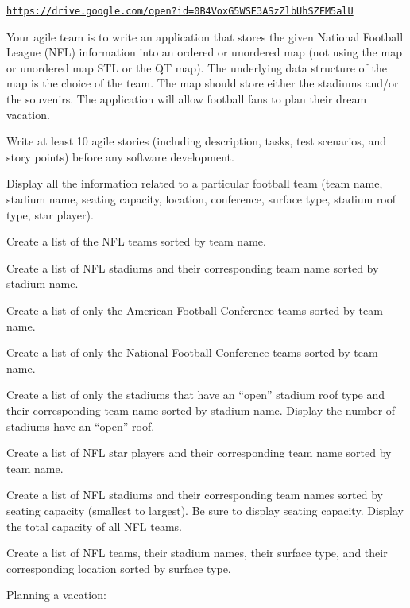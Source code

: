 \href{https://drive.google.com/open?id=0B4VoxG5WSE3ASzZlbUhSZFM5alU}{\tt https\+://drive.\+google.\+com/open?id=0\+B4\+Vox\+G5\+W\+S\+E3\+A\+Sz\+Zlb\+Uh\+S\+Z\+F\+M5alU} 

 Your agile team is to write an application that stores the given National Football League (N\+FL) information into an ordered or unordered map (not using the map or unordered map S\+TL or the QT map). The underlying data structure of the map is the choice of the team. The map should store either the stadiums and/or the souvenirs. The application will allow football fans to plan their dream vacation.


\begin{DoxyEnumerate}
\item Write at least 10 agile stories (including description, tasks, test scenarios, and story points) before any software development.
\item Display all the information related to a particular football team (team name, stadium name, seating capacity, location, conference, surface type, stadium roof type, star player).
\item Create a list of the N\+FL teams sorted by team name.
\item Create a list of N\+FL stadiums and their corresponding team name sorted by stadium name.
\item Create a list of only the American Football Conference teams sorted by team name.
\item Create a list of only the National Football Conference teams sorted by team name.
\item Create a list of only the stadiums that have an “open” stadium roof type and their corresponding team name sorted by stadium name. Display the number of stadiums have an “open” roof.
\item Create a list of N\+FL star players and their corresponding team name sorted by team name.
\item Create a list of N\+FL stadiums and their corresponding team names sorted by seating capacity (smallest to largest). Be sure to display seating capacity. Display the total capacity of all N\+FL teams.
\item Create a list of N\+FL teams, their stadium names, their surface type, and their corresponding location sorted by surface type.
\end{DoxyEnumerate}

Planning a vacation\+:


